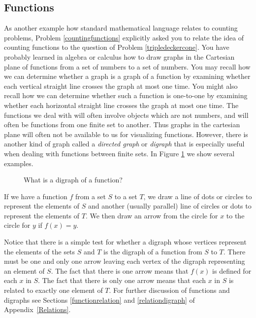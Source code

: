 \subsection{Functions} As another example how standard mathematical language
relates to counting problems, Problem \ref{countingfunctions} explicitly asked
you to relate the idea of counting functions to the question of
Problem \ref{tripledeckercone}.
  You have probably learned in algebra or calculus how to draw graphs in the
Cartesian plane of functions from a set of numbers to a set of numbers.  You
may recall how we can determine whether a graph is a graph of a function by
examining whether each vertical straight line crosses the graph at most one
time.  You might also recall how we can determine whether such a function is
one-to-one by examining whether each horizontal straight line crosses the
graph at most one time.  The functions we deal with will often involve
objects which are not numbers, and will often be functions from one finite
set to another.  Thus graphs in the cartesian plane will often not be
available to us for visualizing functions.  However, there is another kind of
graph called a
{\em directed graph} or
{\em digraph} that is especially useful
when dealing with functions between finite sets.  In Figure
\ref{functiondigraphs} we show several examples.
\begin{figure}[hbt]\caption{What is a digraph of a
function?}\label{functiondigraphs}\smallskip
\begin{center}\end{center}
\end{figure}
 If we have a function
$f$ from a set
$S$ to a set $T$, we draw a line of dots or circles to represent the elements
of
$S$ and another (usually parallel) line of circles or dots to represent the
elements of
$T$.  We then draw an arrow from the circle for $x$ to the circle for $y$ if
$f(x) = y$.



Notice that there is a simple test for whether a digraph whose vertices
represent the elements of the sets $S$ and $T$ is the digraph of a function
from $S$ to $T$.  There must be one and only one arrow leaving each vertex of
the digraph representing an element of $S$.  The fact that there is one arrow
means that $f(x)$ is defined for each $x$ in $S$.  The fact that there is
only one arrow means that each $x$ in $S$ is related to exactly one element of
$T$.  For further discussion of functions and digraphs see Sections
\ref{functionrelation} and \ref{relationdigraph} of {Appendix~\ref{Relations}}.

